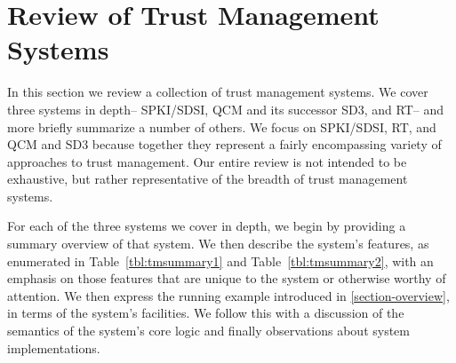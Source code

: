 \section{Review of Trust Management Systems}
\label{section-review}

In this section we review a collection of trust management systems.
We cover three systems in depth-- SPKI/SDSI, QCM and its successor
SD3, and RT-- and more briefly summarize a number of others.  We focus
on SPKI/SDSI, RT, and QCM and SD3 because together they represent a fairly
encompassing variety of approaches to trust management.  Our entire
review is not intended to be exhaustive, but rather representative of
the breadth of trust management systems.

For each of the three systems we cover in depth, we begin by providing
a summary overview of that system. We then describe the system's
features, as enumerated in Table~\ref{tbl:tmsummary1} and
Table~\ref{tbl:tmsummary2}, with an emphasis on those features that
are unique to the system or otherwise worthy of attention. We then
express the running example introduced in \autoref{section-overview},
in terms of the system's facilities. We follow this with a discussion
of the semantics of the system's core logic and finally observations
about system implementations.








